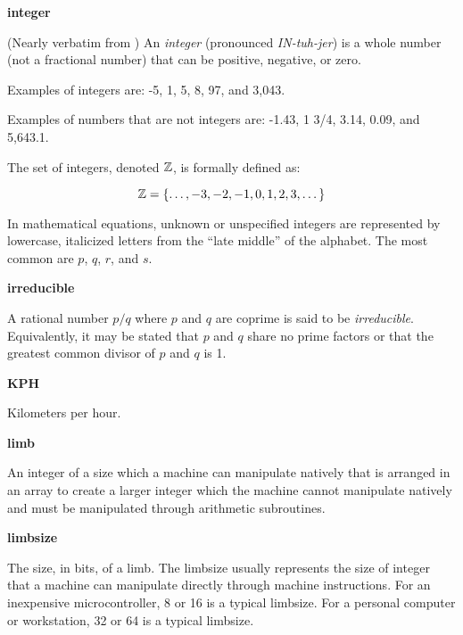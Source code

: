 \begin{vworktermglossaryenum}
\item \textbf{integer}%

      (Nearly verbatim from \cite{bibref:w:wwwwhatiscom}) An \emph{integer}
      (pronounced \emph{IN-tuh-jer}) is a whole number
      (not a fractional number) that can be positive, negative, or zero. 

      Examples of integers are: -5, 1, 5, 8, 97, and 3,043. 

      Examples of numbers that are not integers are: -1.43, 1 3/4, 3.14, 
      0.09, and 5,643.1. 

      The set of integers, denoted ${\mathbb{Z}}{}$, is formally defined as:

      \begin{equation}
      {\mathbb{Z}}{} = \{\ldots{}, -3, -2, -1, 0, 1, 2, 3, \ldots{} \}
      \end{equation}

      In mathematical equations, unknown or unspecified integers are 
      represented by lowercase, italicized letters from the 
      ``late middle'' of the alphabet.  The most common 
      are $p$, $q$, $r$, and $s$.

\item \textbf{irreducible}

      A rational number $p/q$ where $p$ and $q$ are coprime
      is said to be \emph{irreducible}.
      Equivalently, it may be stated that $p$ and $q$ share no prime factors
      or that the greatest common divisor of
      $p$ and $q$ is 1.

\item \textbf{KPH}

      Kilometers per hour.

\item \textbf{limb}

      An integer of a size which a machine can manipulate natively
      that is arranged in an array to create a larger
      integer which the machine cannot manipulate natively and must be
      manipulated through arithmetic subroutines.

\item \textbf{limbsize}

      The size, in bits, of a limb.  The limbsize usually represents
      the size of integer that a machine can manipulate directly
      through machine instructions.  For an inexpensive microcontroller,
      8 or 16 is a typical limbsize.  For a personal computer or 
      workstation, 32 or 64 is a typical limbsize.


\end{vworktermglossaryenum}
